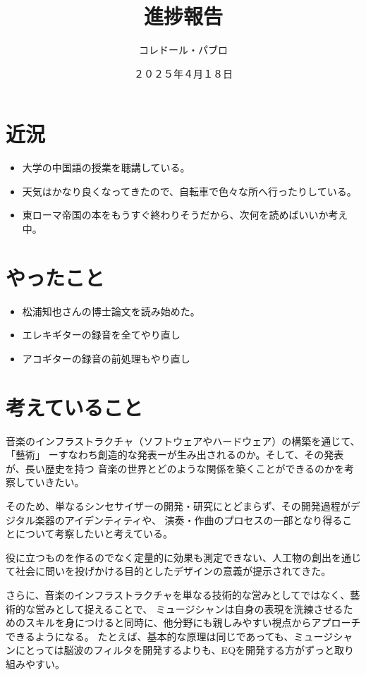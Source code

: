 \documentclass[a4paper, 12pt]{article}
\title{進捗報告}
\author{コレドール・パブロ}
\date{２０２５年４月１８日}
\begin{document}
\maketitle

\section*{近況}
\begin{itemize}
    \item 大学の中国語の授業を聴講している。
    \item 天気はかなり良くなってきたので、自転車で色々な所へ行ったりしている。
    \item 東ローマ帝国の本をもうすぐ終わりそうだから、次何を読めばいいか考え中。
\end{itemize} 

\section*{やったこと}
\begin{itemize}
    \item 松浦知也さんの博士論文を読み始めた。\cite{Matsuura_Mimium}
    \item エレキギターの録音を全てやり直し
    \item アコギターの録音の前処理もやり直し
\end{itemize}

\section*{考えていること}

音楽のインフラストラクチャ（ソフトウェアやハードウェア）の構築を通じて、「藝術」
ーすなわち創造的な発表ーが生み出されるのか。そして、その発表が、長い歴史を持つ
音楽の世界とどのような関係を築くことができるのかを考察していきたい。

そのため、単なるシンセサイザーの開発・研究にとどまらず、その開発過程がデジタル楽器のアイデンティティや、
演奏・作曲のプロセスの一部となり得ることについて考察したいと考えている。

\begin{displayquote}
    役に立つものを作るのでなく定量的に効果も測定できない、人工物の創出を通じて社会に問いを投げかける目的としたデザインの意義が提示されてきた。
    \cite{Matsuura_Mimium}
\end{displayquote}

さらに、音楽のインフラストラクチャを単なる技術的な営みとしてではなく、藝術的な営みとして捉えることで、
ミュージシャンは自身の表現を洗練させるためのスキルを身につけると同時に、他分野にも親しみやすい視点からアプローチできるようになる。
たとえば、基本的な原理は同じであっても、ミュージシャンにとっては脳波のフィルタを開発するよりも、EQを開発する方がずっと取り組みやすい。
\end{document}
